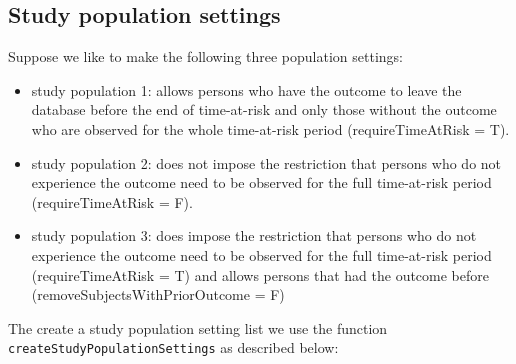 \documentclass[]{article}
\providecommand{\tightlist}{%
  \setlength{\itemsep}{0pt}\setlength{\parskip}{0pt}}
\begin{document}
\subsection{Study population settings}\label{study-population-settings}

Suppose we like to make the following three population settings:

\begin{itemize}
\tightlist
\item
  study population 1: allows persons who have the outcome to leave the
  database before the end of time-at-risk and only those without the
  outcome who are observed for the whole time-at-risk period
  (requireTimeAtRisk = T).
\item
  study population 2: does not impose the restriction that persons who
  do not experience the outcome need to be observed for the full
  time-at-risk period (requireTimeAtRisk = F).
\item
  study population 3: does impose the restriction that persons who do
  not experience the outcome need to be observed for the full
  time-at-risk period (requireTimeAtRisk = T) and allows persons that
  had the outcome before (removeSubjectsWithPriorOutcome = F)
\end{itemize}

The create a study population setting list we use the function
\texttt{createStudyPopulationSettings} as described below:
\end{document}
